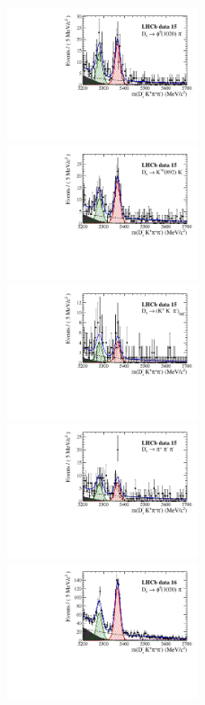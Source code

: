 \begin{figure}[h]
\includegraphics[height=!,width=0.5\textwidth]{figs/MassFit/signal_y15_phipi.pdf}
\includegraphics[height=!,width=0.5\textwidth]{figs/MassFit/signal_y15_KsK.pdf}
\includegraphics[height=!,width=0.5\textwidth]{figs/MassFit/signal_y15_KKpi_NR.pdf}
\includegraphics[height=!,width=0.5\textwidth]{figs/MassFit/signal_y15_pipipi.pdf}
\includegraphics[height=!,width=0.5\textwidth]{figs/MassFit/signal_y16_phipi.pdf}

\end{figure}

